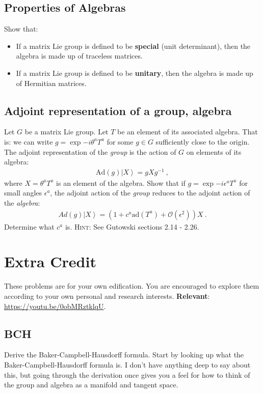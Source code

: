 \documentclass[12pt]{article}
\numberwithin{equation}{subsection}    %
\newcommand{\ket}[1]{\left|#1\right\rangle}    %
\begin{document}
\subsection{Properties of Algebras}

Show that:
\begin{itemize}
  \item If a matrix Lie group is defined to be \textbf{special} (unit determinant), then the algebra is made up of traceless matrices.
  \item If a matrix Lie group is defined to be \textbf{unitary}, then the algebra is made up of Hermitian matrices.
\end{itemize}

\subsection{Adjoint representation of a group, algebra}

Let $G$ be a matrix Lie group. Let $T$ be an element of its associated algebra. That is: we can write $g = \exp{-i\theta^a T^a}$ for some $g\in G$ sufficiently close to the origin. The adjoint representation of the \emph{group} is the action of $G$ on elements of its algebra:
\begin{align}
  \text{Ad}(g) \ket{X} = g X g^{-1} \ ,
\end{align}
where $X = \theta^a T^a$ is an element of the algebra.
Show that if $g = \exp{-i\epsilon^a T^a}$ for small angles $\epsilon^a$, the adjoint action of the \emph{group} reduces to the adjoint action of the \emph{algebra}:
\begin{align}
  Ad(g) \ket{X} = \left(1 + c^a \text{ad}(T^a) + \mathcal O(\epsilon^2) \right) X \ .
\end{align}
Determine what $c^a$ is.
%
\textsc{Hint}: See Gutowski sections 2.14 - 2.26.

\section*{Extra Credit}

These problems are for your own edification. You are encouraged to explore them according to your own personal and research interests. \textbf{Relevant}: \url{https://youtu.be/0obMRztklqU}.


\subsection*{BCH}

Derive the Baker-Campbell-Hausdorff formula. Start by looking up what the Baker-Campbell-Hausdorff formula is. I don't have anything deep to say about this, but going through the derivation once gives you a feel for how to think of the group and algebra as a manifold and tangent space.
\end{document}
